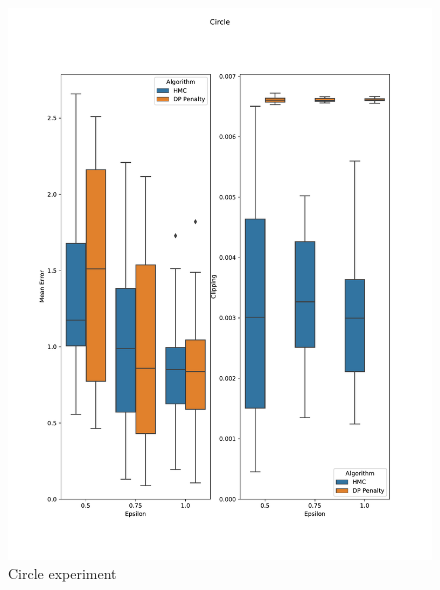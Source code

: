 ﻿\documentclass[a4paper]{article}
\begin{document}
\begin{figure}[h]
  \centering
  \includegraphics[width=\textwidth]{figures/circle.pdf}
  \caption{Circle experiment}
  \label{circle_fig}
\end{figure}

\printbibliography{}
\end{document}
